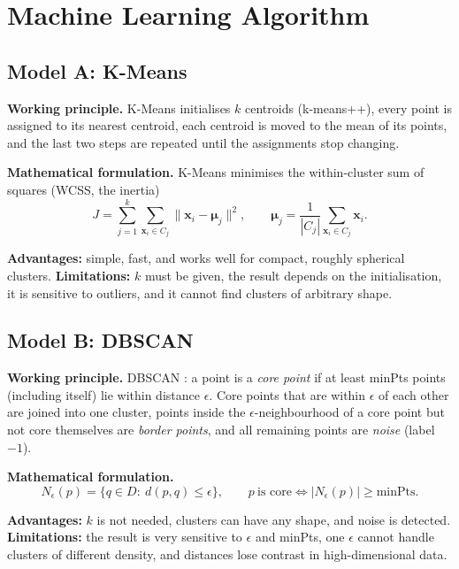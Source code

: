 \documentclass[12pt,a4paper]{article}
\begin{document}
\section{Machine Learning Algorithm}

\subsection*{Model A: K-Means}
\textbf{Working principle.} K-Means \cite{lloyd1982} initialises $k$ centroids (k-means++), every point is assigned to its nearest centroid, each centroid is moved to the mean of its points, and the last two steps are repeated until the assignments stop changing.

\textbf{Mathematical formulation.} K-Means minimises the within-cluster sum of squares (WCSS, the inertia)
\begin{equation}
J=\sum_{j=1}^{k}\sum_{\mathbf{x}_i\in C_j}\lVert \mathbf{x}_i-\boldsymbol{\mu}_j\rVert^{2}, \qquad \boldsymbol{\mu}_j=\frac{1}{|C_j|}\sum_{\mathbf{x}_i\in C_j}\mathbf{x}_i .
\end{equation}

\textbf{Advantages:} simple, fast, and works well for compact, roughly spherical clusters. \textbf{Limitations:} $k$ must be given, the result depends on the initialisation, it is sensitive to outliers, and it cannot find clusters of arbitrary shape.

\subsection*{Model B: DBSCAN}
\textbf{Working principle.} DBSCAN \cite{ester1996}: a point is a \emph{core point} if at least minPts points (including itself) lie within distance $\epsilon$. Core points that are within $\epsilon$ of each other are joined into one cluster, points inside the $\epsilon$-neighbourhood of a core point but not core themselves are \emph{border points}, and all remaining points are \emph{noise} (label $-1$).

\textbf{Mathematical formulation.}
\begin{equation}
N_\epsilon(p)=\{q\in D:\ d(p,q)\le\epsilon\},\qquad p\ \text{is core}\iff |N_\epsilon(p)|\ge \text{minPts}.
\end{equation}

\textbf{Advantages:} $k$ is not needed, clusters can have any shape, and noise is detected. \textbf{Limitations:} the result is very sensitive to $\epsilon$ and minPts, one $\epsilon$ cannot handle clusters of different density, and distances lose contrast in high-dimensional data.
\end{document}
